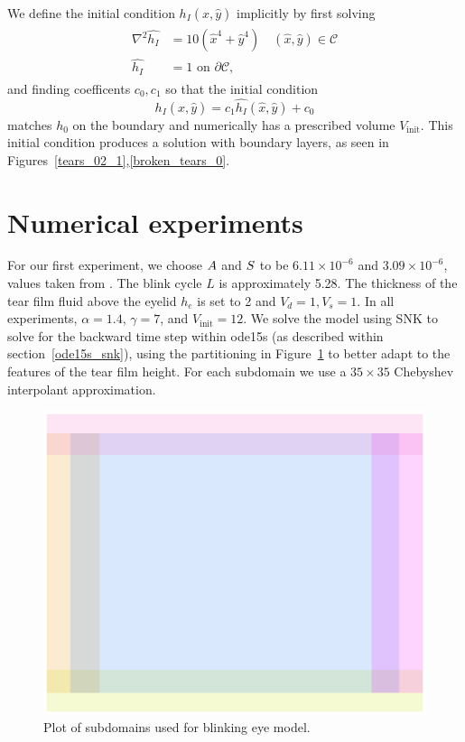 We define the initial condition $h_I(\hat{x},\hat{y})$ implicitly by first solving
\begin{align}
\begin{aligned}
\nabla^2 \hat{h_I} &= 10 (\hat{x}^4 +\hat{y}^4) \quad (\hat{x},\hat{y}) \in \mathcal{C} \\
 \hat{h_I} &= 1 \mbox{ on } \partial \mathcal{C},
\end{aligned} 
\end{align}
and finding coefficents $c_0,c_1$ so that the initial condition
\begin{equation}
h_I(\hat{x},\hat{y}) = c_1 \hat{h_I}(\hat{x},\hat{y})+c_0
\end{equation}
matches $h_0$ on the boundary and numerically has a prescribed volume $V_{\mbox{init}}$. This initial condition produces a solution with boundary layers, as seen in Figures~\ref{tears_02_1},\ref{broken_tears_0}.

\section{Numerical experiments}
\label{eye_experiments}
For our first experiment, we choose $A$ and $S$ to be $6.11 \times 10^{-6}$ and $3.09 \times 10^{-6}$, values taken from \cite{braun2015dynamics}. The blink cycle $L$ is approximately 5.28. The thickness of the tear film fluid above the eyelid $h_e$ is set to 2 and $V_d=1, V_s=1$. In all experiments, $\alpha=1.4$, $\gamma=7$, and $V_{\mbox{init}}=12$. We solve the model using SNK to solve for the backward time step within ode15s (as described within section~\ref{ode15s_snk}), using the partitioning in Figure~\ref{eye_partition} to better adapt to the features of the tear film height. For each subdomain we use a $35 \times 35$ Chebyshev interpolant approximation.
\begin{figure}
	\centering
	\includegraphics[scale=0.6]{Chapter4/Eye_domains}
	\caption{Plot of subdomains used for blinking eye model.}
	\label{eye_partition}
\end{figure}

